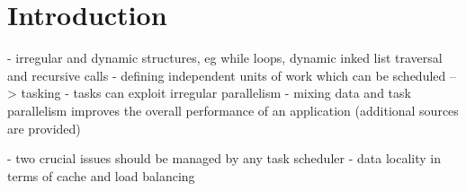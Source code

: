 \section{Introduction}
\cite{Ayguade.2009}
  - irregular and dynamic structures, eg while loops, dynamic inked list traversal and recursive calls
  - defining independent units of work which can be scheduled
    --> tasking
  - tasks can exploit irregular parallelism
  - mixing data and task parallelism improves the overall performance of an application (additional sources are provided)

\cite{Qawasmeh.2014}
  - two crucial issues should be managed by any task scheduler
    - data locality in terms of cache and load balancing
